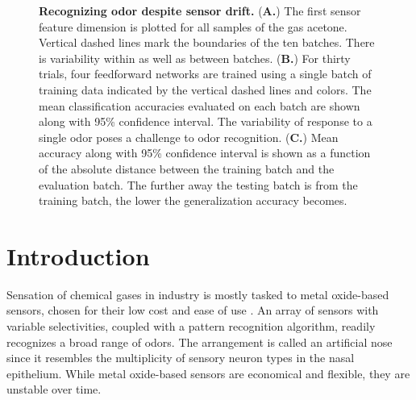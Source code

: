 \documentclass[onecolumn,pre,floats,aps,amsmath,amssymb,superscriptaddress]{revtex4-1}
\begin{document}
\begin{figure}
	\centering
	\caption{\textbf{Recognizing odor despite sensor drift.} (\textbf{A.}) The first sensor feature dimension is plotted for all samples of the gas acetone. Vertical dashed lines mark the boundaries of the ten batches. There is variability within as well as between batches. (\textbf{B.}) For thirty trials, four feedforward networks are trained using a single batch of training data indicated by the vertical dashed lines and colors. The mean classification accuracies evaluated on each batch are shown along with 95\% confidence interval. The variability of response to a single odor poses a challenge to odor recognition. (\textbf{C.}) Mean accuracy along with 95\% confidence interval is shown as a function of the absolute distance between the training batch and the evaluation batch. The further away the testing batch is from the training batch, the lower the generalization accuracy becomes.}
\end{figure}
\section{Introduction}
Sensation of chemical gases in industry is mostly tasked to metal oxide-based sensors, chosen for their low cost and ease of use \cite{dickinson_current_1998,barsan_metal_2007}. An array of sensors with variable selectivities, coupled with a pattern recognition algorithm, readily recognizes a broad range of odors. The arrangement is called an artificial nose since it resembles the multiplicity of sensory neuron types in the nasal epithelium. While metal oxide-based sensors are economical and flexible, they are unstable over time.
\end{document}
